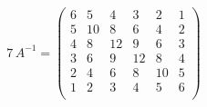 \[
7\,A^{-1}=\begin{pmatrix}
6 & 5 & 4 & 3 & 2 & 1\\
5 & 10 & 8 & 6 & 4 & 2\\
4 & 8 & 12 & 9 & 6 & 3\\
3 & 6 & 9 & 12 & 8 & 4\\
2 & 4 & 6 & 8 & 10 & 5\\
1 & 2 & 3 & 4 & 5 & 6\\
\end{pmatrix}
\]
